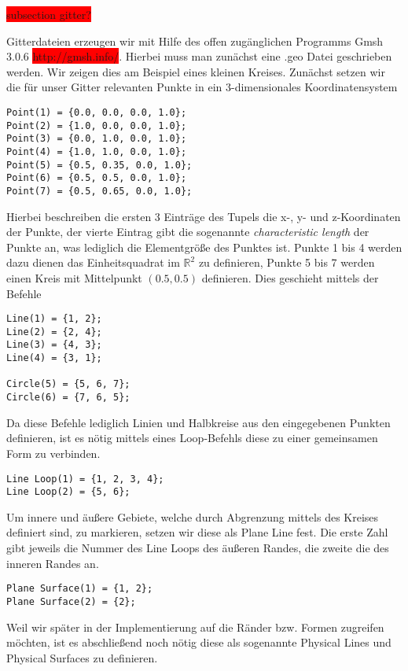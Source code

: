 \colorbox{red}{subsection gitter?}

Gitterdateien erzeugen wir mit Hilfe des offen zugänglichen Programms \textsf{Gmsh 3.0.6} \colorbox{red}{http://gmsh.info/}. Hierbei muss man zunächst eine \textsf{.geo} Datei geschrieben werden. Wir zeigen dies am Beispiel eines kleinen Kreises.
Zunächst setzen wir die für unser Gitter relevanten Punkte in ein 3-dimensionales Koordinatensystem

\begin{lstlisting}
Point(1) = {0.0, 0.0, 0.0, 1.0};
Point(2) = {1.0, 0.0, 0.0, 1.0};
Point(3) = {0.0, 1.0, 0.0, 1.0};
Point(4) = {1.0, 1.0, 0.0, 1.0};
Point(5) = {0.5, 0.35, 0.0, 1.0};
Point(6) = {0.5, 0.5, 0.0, 1.0};
Point(7) = {0.5, 0.65, 0.0, 1.0};
\end{lstlisting}

Hierbei beschreiben die ersten 3 Einträge des Tupels die x-, y- und z-Koordinaten der Punkte, der vierte Eintrag gibt die sogenannte \textit{characteristic length} der Punkte an, was lediglich die Elementgröße des Punktes ist. Punkte 1 bis 4 werden dazu dienen das Einheitsquadrat im $\mathbb{R}^2$ zu definieren, Punkte 5 bis 7 werden einen Kreis mit Mittelpunkt $(0.5,0.5)$ definieren. Dies geschieht mittels der Befehle

\begin{lstlisting}
Line(1) = {1, 2};
Line(2) = {2, 4};
Line(3) = {4, 3};
Line(4) = {3, 1};

Circle(5) = {5, 6, 7};
Circle(6) = {7, 6, 5};
\end{lstlisting}

Da diese Befehle lediglich Linien und Halbkreise aus den eingegebenen Punkten definieren, ist es nötig mittels eines \textsf{Loop}-Befehls diese zu einer gemeinsamen Form zu verbinden.

\begin{lstlisting}
Line Loop(1) = {1, 2, 3, 4};
Line Loop(2) = {5, 6};
\end{lstlisting}

Um innere und äußere Gebiete, welche durch Abgrenzung mittels des Kreises definiert sind, zu markieren, setzen wir diese als \textsf{Plane Line} fest. Die erste Zahl gibt jeweils die Nummer des \textsf{Line Loops} des äußeren Randes, die zweite die des inneren Randes an.

\begin{lstlisting}
Plane Surface(1) = {1, 2};
Plane Surface(2) = {2};
\end{lstlisting}

Weil wir später in der Implementierung auf die Ränder bzw. Formen zugreifen möchten, ist es abschließend noch nötig diese als sogenannte \textsf{Physical Lines} und \textsf{Physical Surfaces} zu definieren. 

